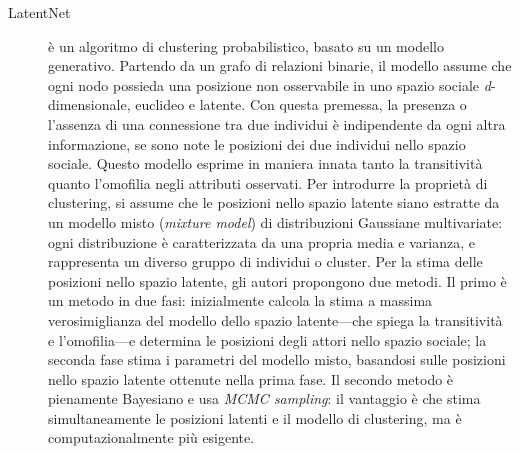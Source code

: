\begin{description}
\item[LatentNet] \`e un algoritmo di clustering probabilistico, basato su un modello generativo. Partendo da un grafo di relazioni binarie, il modello assume che ogni nodo possieda una posizione non osservabile in uno spazio sociale \mbox{\textit{d}-dimensionale}, euclideo e latente. Con questa premessa, la presenza o l'assenza di una connessione tra due individui \`e indipendente da ogni altra informazione, se sono note le posizioni dei due individui nello spazio sociale. Questo modello esprime in maniera innata tanto la transitivit\`a quanto l'omofilia negli attributi osservati. Per introdurre la propriet\`a di clustering, si assume che le posizioni nello spazio latente siano estratte da un modello misto (\textit{mixture model}) di distribuzioni Gaussiane multivariate: ogni distribuzione \`e caratterizzata da una propria media e varianza, e rappresenta un diverso gruppo di individui o cluster. Per la stima delle posizioni nello spazio latente, gli autori propongono due metodi. Il primo \`e un metodo in due fasi: inizialmente calcola la stima a massima verosimiglianza del modello dello spazio latente---che spiega la transitivit\`a e l'omofilia---e determina le posizioni degli attori nello spazio sociale; la seconda fase stima i parametri del modello misto, basandosi sulle posizioni nello spazio latente ottenute nella prima fase. Il secondo metodo \`e pienamente Bayesiano e usa \textit{MCMC sampling}: il vantaggio \`e che stima simultaneamente le posizioni latenti e il modello di clustering, ma \`e computazionalmente pi\`u esigente.


\end{description}
